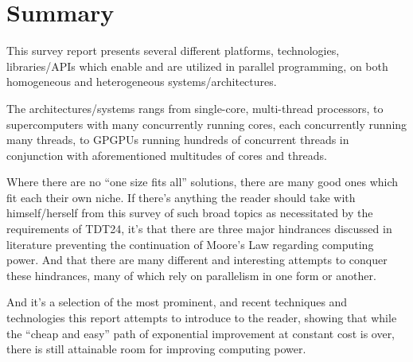 
\section{Summary}
\label{sec:summary}

This survey report presents several different platforms, technologies, libraries/APIs which enable and are utilized in parallel programming, on both homogeneous and heterogeneous systems/architectures.

The architectures/systems rangs from single-core, multi-thread processors, to supercomputers with many concurrently running cores, each concurrently running many threads, to GPGPUs running hundreds of concurrent threads in conjunction with aforementioned multitudes of cores and threads.

Where there are no ``one size fits all'' solutions, there are many good ones which fit each their own niche.
If there's anything the reader should take with himself/herself from this survey of such broad topics as necessitated by the requirements of TDT24, it's that there are three major hindrances discussed in literature preventing the continuation of Moore's Law regarding computing power.
And that there are many different and interesting attempts to conquer these hindrances, many of which rely on parallelism in one form or another.

And it's a selection of the most prominent, and recent techniques and technologies this report attempts to introduce to the reader, showing that while the ``cheap and easy'' path of exponential improvement at constant cost is over, there is still attainable room for improving computing power.
